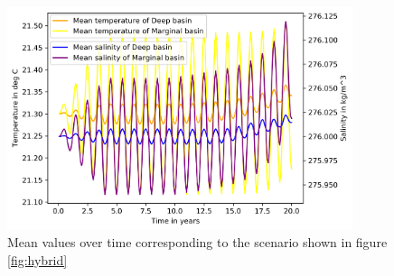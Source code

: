 \documentclass[twocolumn]{article}
\begin{document}
\begin{figure}
\centering
\includegraphics[width=0.9\textwidth,keepaspectratio]{hybrid_means.png}
\caption{Mean values over time corresponding to the scenario shown in figure \ref{fig:hybrid}}
\label{fig:hybrid_means}
\end{figure}\hfill
\end{document}
